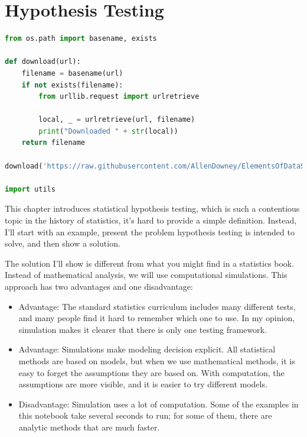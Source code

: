 \hypertarget{hypothesis-testing}{%
\chapter{Hypothesis Testing}\label{hypothesis-testing}}

\begin{lstlisting}[language=Python,style=source]
from os.path import basename, exists

def download(url):
    filename = basename(url)
    if not exists(filename):
        from urllib.request import urlretrieve

        local, _ = urlretrieve(url, filename)
        print("Downloaded " + str(local))
    return filename

download('https://raw.githubusercontent.com/AllenDowney/ElementsOfDataScience/v1/utils.py')

import utils
\end{lstlisting}

This chapter introduces statistical hypothesis testing, which is such a
contentious topic in the history of statistics, it's hard to provide a
simple definition. Instead, I'll start with an example, present the
problem hypothesis testing is intended to solve, and then show a
solution.

The solution I'll show is different from what you might find in a
statistics book. Instead of mathematical analysis, we will use
computational simulations. This approach has two advantages and one
disadvantage:

\begin{itemize}
\item
  Advantage: The standard statistics curriculum includes many different
  tests, and many people find it hard to remember which one to use. In
  my opinion, simulation makes it clearer that there is only one testing
  framework.
\item
  Advantage: Simulations make modeling decision explicit. All
  statistical methods are based on models, but when we use mathematical
  methods, it is easy to forget the assumptions they are based on. With
  computation, the assumptions are more visible, and it is easier to try
  different models.
\item
  Disadvantage: Simulation uses a lot of computation. Some of the
  examples in this notebook take several seconds to run; for some of
  them, there are analytic methods that are much faster.
\end{itemize}


